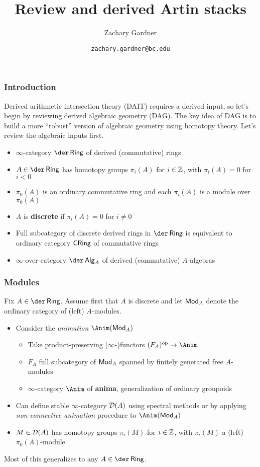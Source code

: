 \documentclass[11pt]{beamer}
\begin{document}
\title{Review and derived Artin stacks}
\author{Zachary Gardner}
\date{\texttt{zachary.gardner@bc.edu}}

\begin{frame}
\titlepage
\end{frame}

\begin{frame}
\frametitle{Introduction}
Derived arithmetic intersection theory (DAIT) requires a derived input, so let's begin by reviewing derived algebraic geometry (DAG). The key idea of DAG is to build a more ``robust'' version of algebraic geometry using homotopy theory. Let's review the algebraic inputs first.
\begin{itemize}
\pause\item $\infty$-category $\der\Ring$ of derived (commutative) rings
\pause\item $A\in\der\Ring$ has homotopy groups $\pi_i(A)$ for $i\in\mathbb{Z}$, with $\pi_i(A)=0$ for $i<0$
\pause\item $\pi_0(A)$ is an ordinary commutative ring and each $\pi_i(A)$ is a module over $\pi_0(A)$
\pause\item $A$ is \textbf{discrete} if $\pi_i(A)=0$ for $i\neq0$
\pause\item Full subcategory of discrete derived rings in $\der\Ring$ is equivalent to ordinary category $\operatorname{\mathsf{CRing}}$ of commutative rings
\pause\item $\infty$-over-category $\der\Alg_A$ of derived (commutative) $A$-algebras
\end{itemize}
\end{frame}

\begin{frame}
\frametitle{Modules}
\pause Fix $A\in\der\Ring$. Assume first that $A$ is discrete and let $\operatorname{\mathsf{Mod}}_A$ denote the ordinary category of (left) $A$-modules.
\begin{itemize}
\pause\item Consider the \emph{animation} $\Anim(\Mod_A)$
\begin{itemize}
	\pause\item Take product-preserving ($\infty$-)functors $(F_A)^{\op}\to\Anim$
	\pause\item $F_A$ full subcategory of $\operatorname{\mathsf{Mod}}_A$ spanned by finitely generated free $A$-modules
	\pause\item $\infty$-category $\Anim$ of \textbf{anima}, generalization of ordinary groupoids
\end{itemize}

\pause\item Can define stable $\infty$-category $\mathcal{D}(A)$ using spectral methods or by applying \emph{non-connective animation} procedure to $\Anim(\Mod_A)$

\pause\item $M\in\mathcal{D}(A)$ has homotopy groups $\pi_i(M)$ for $i\in\mathbb{Z}$, with $\pi_i(M)$ a (left) $\pi_0(A)$-module
\end{itemize}
\pause Most of this generalizes to any $A\in\der\Ring$.
\end{frame}
\end{document}
